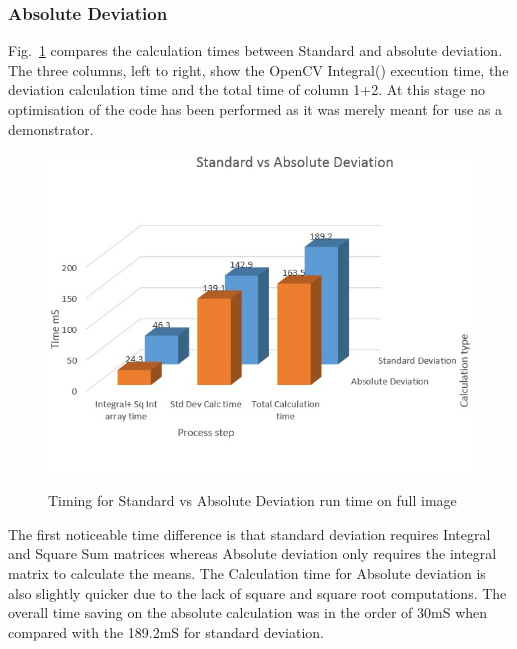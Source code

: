 \documentclass[journal]{IEEEtran}
\begin{document}
\subsubsection*{Absolute Deviation}
Fig.~\ref{fig:StdvAbsDevPlot} compares the calculation times between Standard and absolute deviation. The three columns, left to right, show the OpenCV Integral() execution time, the deviation calculation time and the total time of column 1+2. At this stage no optimisation of the code has been performed as it was merely meant for use as a demonstrator.
 \begin{figure}[htbp]
  \centering
    \caption{Timing for Standard vs Absolute Deviation run time on full image}
    \includegraphics[width=\columnwidth]{StdvAbsDevTiming.jpg}
  \label{fig:StdvAbsDevPlot}
\end{figure}
The first noticeable time difference is that standard deviation requires Integral and Square Sum matrices whereas Absolute deviation only requires the integral matrix to calculate the means. The Calculation time for Absolute deviation is also slightly quicker due to the lack of square and square root computations. The overall time saving on the absolute calculation was in the order of 30mS when compared with the 189.2mS for standard deviation.\\
\end{document}
